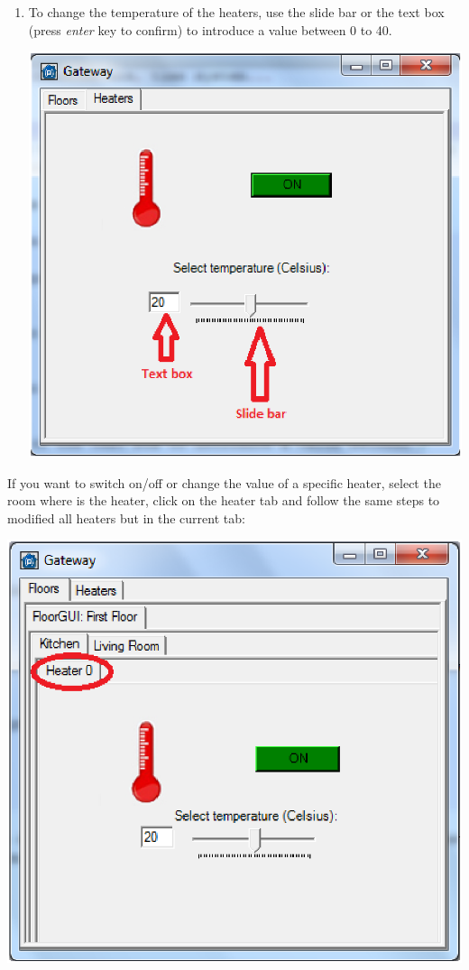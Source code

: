 \begin{enumerate}
\begin{center}
\end{center}
\item To change the temperature of the heaters, use the slide bar or the text box (press \emph{enter} key to confirm) to introduce a value between 0 to 40.
\begin{center}
	\includegraphics[width=.68\linewidth]{images/changeTemperatureHeater.eps}
	\\
\vspace{1cm}
\end{center}

\end{enumerate}
If you want to switch on/off or change the value of a specific heater, select the room where is the heater, click on the heater tab and follow the same steps to modified all heaters but in the current tab:
\begin{center}
	\includegraphics[width=.68\linewidth]{images/specificHeater.eps}
	\\
\vspace{1cm}
\end{center}

